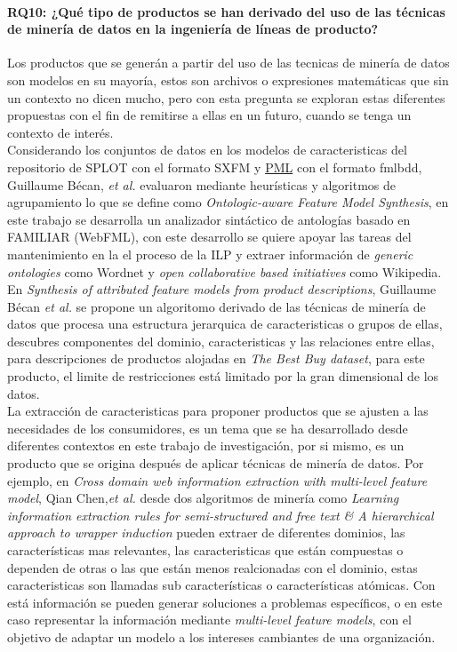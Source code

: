 \paragraph{RQ10: ¿Qué tipo de productos se han derivado del uso de las técnicas de minería de datos en la ingeniería de líneas de producto?}
Los productos que se generán a partir del uso de las tecnicas de minería de datos son modelos en su mayoría, estos son archivos o expresiones matemáticas que sin un contexto no dicen mucho, pero con esta pregunta se exploran estas diferentes propuestas con el fin de remitirse a ellas en un futuro, cuando se tenga un contexto de interés.\\
Considerando los conjuntos de datos en los modelos de caracteristicas  del repositorio de SPLOT\cite{Mendonca:2009:SSP:1639950.1640002} con el formato SXFM y \href{http://www.palladio-simulator.com}{PML} con el formato fmlbdd,  Guillaume Bécan, \textit{et al.} evaluaron mediante heurísticas y algoritmos de agrupamiento lo que se define como \textit{Ontologic-aware Feature Model Synthesis}\cite{B??can2015}, en este trabajo se desarrolla un analizador sintáctico de antologías basado en FAMILIAR\cite{FAMILIAR} (WebFML), con este desarrollo se quiere apoyar las tareas del mantenimiento en la el proceso de la ILP y extraer información de \textit{generic ontologies }como Wordnet y \textit{open collaborative based initiatives} como Wikipedia. En \textit{Synthesis of attributed feature models from product descriptions}\cite{Guillaume2015}, Guillaume Bécan  \textit{et al.} se propone un algoritomo derivado de las técnicas de minería de datos que procesa una estructura jerarquica de caracteristicas o grupos de ellas, descubres componentes del dominio, caracteristicas y las relaciones entre ellas, para descripciones de productos alojadas en \textit{The Best Buy dataset}, para este producto, el limite de restricciones está limitado por la gran dimensional de los datos.\\
La extracción de caracteristicas para proponer productos que se ajusten a las necesidades de los consumidores, es un tema que se ha desarrollado desde diferentes contextos en este trabajo de investigación, por si mismo, es un producto que se origina después de aplicar técnicas de minería de datos. Por ejemplo, en \textit{Cross domain web information extraction with multi-level feature model}\cite{Chen2014a}, Qian Chen,\textit{et al.} desde dos algoritmos de minería como \textit{Learning information extraction rules for semi-structured and free text \& A hierarchical approach to wrapper induction}  pueden extraer de diferentes dominios, las características mas relevantes, las caracteristicas que están compuestas o dependen de otras o las que están menos realcionadas con el dominio, estas caracteristicas son llamadas sub características o características atómicas. Con está información se pueden generar soluciones a problemas específicos, o en este caso representar la información mediante \textit{multi-level feature models}, con el objetivo de adaptar un modelo a los intereses cambiantes de una organización.\\
